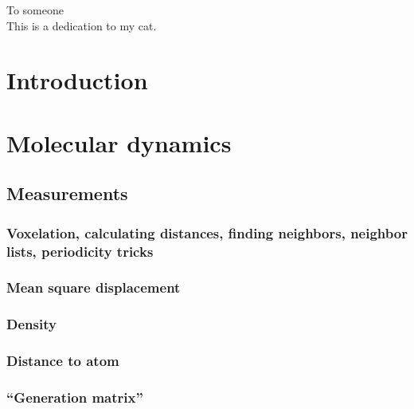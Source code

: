 \documentclass[twoside,english]{uiofysmaster}
\begin{document}

\cleardoublepage

\begin{abstract}
\lipsum
\end{abstract}

\begin{dedication}
  To someone
  \\\vspace{12pt}
  This is a dedication to my cat.
\end{dedication}

\begin{acknowledgements}
  \lipsum
\end{acknowledgements}

\tableofcontents

\part{Introduction}

\part{Molecular dynamics}
    


\chapter{Measurements}
    \section{Voxelation, calculating distances, finding neighbors, neighbor lists, periodicity tricks\label{sec:voxelation}}
    \section{Mean square displacement}
    \section{Density}
    \section{Distance to atom}
    \section{``Generation matrix''}
\end{document}
